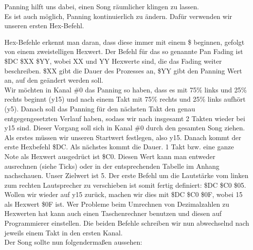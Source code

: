 \bigskip

Panning hilft uns dabei, einen Song räumlicher klingen zu lassen. \\
Es ist auch möglich, Panning kontinuierlich zu ändern. Dafür verwenden wir unseren ersten Hex-Befehl.

\bigskip
Hex-Befehle erkennt man daran, dass diese immer mit einem \$ beginnen, gefolgt von einem zweistelligen Hexwert. Der Befehl für das so genannte Pan Fading ist \$DC \$XX \$YY, wobei XX und YY Hexwerte sind, die das Fading weiter beschreiben. \$XX gibt die Dauer des Prozesses an, \$YY gibt den Panning Wert an, auf den geändert werden soll. \\
Wir möchten in Kanal \#0 das Panning so haben, dass es mit 75\% links und 25\% rechts beginnt (y15) und nach einem Takt mit 75\% rechts und 25\% links aufhört (y5). Danach soll das Panning für den nächsten Takt den genau entgegengesetzten Verlauf haben, sodass wir nach insgesamt 2 Takten wieder bei y15 sind. Dieser Vorgang soll sich in Kanal \#0 durch den gesamten Song ziehen. \\
Als erstes müssen wir unseren Startwert festlegen, also y15. Danach kommt der erste Hexbefehl \$DC. Als nächstes kommt die Dauer. 1 Takt bzw. eine ganze Note als Hexwert ausgedrüct ist \$C0. Diesen Wert kann man entweder ausrechnen (siehe Ticks) oder in der entsprechenden Tabelle im Anhang nachschauen. Unser Zielwert ist 5.  Der erste Befehl um die Lautstärke vom linken zum rechten Lautsprecher zu verschieben ist somit fertig definiert:  \$DC \$C0 \$05.\\
Wollen wir wieder auf y15 zurück, machen wir dies mit \$DC \$C0 \$0F, wobei 15 als Hexwert \$0F ist. Wer Probleme beim Umrechnen von Dezimalzahlen zu Hexwerten hat kann auch einen Taschenrechner benutzen und diesen auf Programmierer einstellen.
Die beiden Befehle schreiben wir nun abwechselnd nach jeweils einem Takt in den ersten Kanal. \\
Der Song sollte nun folgendermaßen aussehen:

\medskip



\medskip


